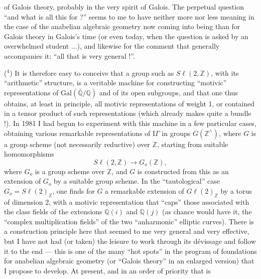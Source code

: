 
of Galois theory, probably in the very spirit of Galois.
The perpetual question ``and what is all this for ?'' seems to me to have
neither more nor less meaning in the case of the anabelian algebraic
geometry now coming into being than for Galois theory in
Galois's time (or even today, when the question is asked
by an overwhelmed student ...), and likewise for the comment
that generally accompanies it: ``all that is very general !''.

($^4$) It is therefore easy to conceive that a group such as $S\ell(2,\mathbb{Z})$, with
its ``arithmetic'' structure, is a veritable machine for constructing
``motivic'' representations of $\mathrm{Gal}(\bar{\mathbb{Q}}/\mathbb{Q})$ and of its
open subgroups, and that one thus obtains, at least in
principle, all motivic representations of weight 1,
or contained in a tensor product of such representations
(which already makes quite a bundle !). In 1981 I had begun
to experiment with this machine in a few particular cases,
obtaining various remarkable representations of $\mathrm{I}\!\Gamma$ in
groups $G(\mathbb{Z}^{\wedge})$, where $G$ is a group scheme (not necessarily
reductive) over $\mathbb{Z}$, starting from suitable homomorphisms
\[ S\ell(2,\mathbb{Z}) \longrightarrow G_o(\mathbb{Z}) , \]
where $G_o$ is a group scheme over $\mathbb{Z}$, and $G$ is constructed
from this as an extension of $G_o$ by a suitable group
scheme. In the ``tautological'' case $G_o = S\ell(2)_{\mathbb{Z}}$,
one finds for $G$ a remarkable extension of $G\ell(2)_{\mathbb{Z}}$ by a torus of
dimension 2, with a motivic representation that ``caps'' those
associated with the class fields of the extensions $\mathbb{Q}(i)$ and $\mathbb{Q}(j)$
(as chance would have it, the ``complex multiplication fields'' of the two
``anharmonic'' elliptic curves). There is a construction principle here
that seemed to me very general and very effective, but
I have not had (or taken) the leisure to work through its dévissage and follow it
to the end --- this is one of the many ``hot spots'' in the
program of foundations for anabelian algebraic geometry (or
``Galois theory'' in an enlarged version) that I propose to
develop. At present, and in an order of priority that is

